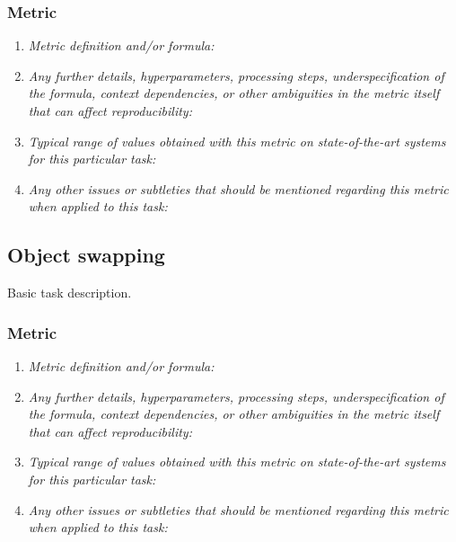 \documentclass[a4paper,11pt]{article}
\begin{document}
        \subsubsection{Metric}
            \begin{enumerate}[label=\alph*.]
                \item \textit{Metric definition and/or formula:}
                \bigskip
                \item \textit{Any further details, hyperparameters, processing steps, underspecification of the formula, context dependencies, or other ambiguities in the metric itself that can affect reproducibility:}
                \bigskip
                \item \textit{Typical range of values obtained with this metric on state-of-the-art systems for this particular task:}
                \bigskip
                \item \textit{Any other issues or subtleties that should be mentioned regarding this metric when applied to this task:}
                \bigskip
            \end{enumerate}

    \subsection{Object swapping}
        Basic task description.
        \subsubsection{Metric}
            \begin{enumerate}[label=\alph*.]
                \item \textit{Metric definition and/or formula:}
                \bigskip
                \item \textit{Any further details, hyperparameters, processing steps, underspecification of the formula, context dependencies, or other ambiguities in the metric itself that can affect reproducibility:}
                \bigskip
                \item \textit{Typical range of values obtained with this metric on state-of-the-art systems for this particular task:}
                \bigskip
                \item \textit{Any other issues or subtleties that should be mentioned regarding this metric when applied to this task:}
                \bigskip
            \end{enumerate}
\end{document}
